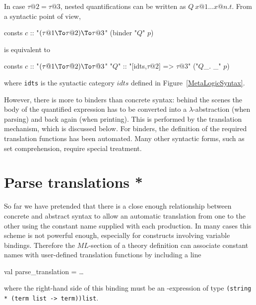 In case $\tau@2 = \tau@3$, nested quantifications can be written as $Q~x@1
\dots x@n.t$.  From a syntactic point of view,
\begin{ttbox}
consts \(c\) :: "\((\tau@1\To\tau@2)\To\tau@3\)"  (binder "\(Q\)" \(p\))
\end{ttbox}
is equivalent to
\begin{ttbox}
consts \(c\)   :: "\((\tau@1\To\tau@2)\To\tau@3\)"
       "\(Q\)" :: "[idts,\(\tau@2\)] => \(\tau@3\)"  ("\(Q\)_.  _" \(p\))
\end{ttbox}
where {\tt idts} is the syntactic category $idts$ defined in
Figure~\ref{MetaLogicSyntax}.

However, there is more to binders than concrete syntax: behind the scenes the
body of the quantified expression has to be converted into a
$\lambda$-abstraction (when parsing) and back again (when printing).  This
is performed by the translation mechanism, which is discussed below.  For
binders, the definition of the required translation functions has been
automated.  Many other syntactic forms, such as set comprehension, require
special treatment.


\section{Parse translations *}
\label{Parse-translations}

So far we have pretended that there is a close enough relationship between
concrete and abstract syntax to allow an automatic translation from one to
the other using the constant name supplied with each production.  In many
cases this scheme is not powerful enough, especially for constructs involving
variable bindings.  Therefore the $ML$-section of a theory definition can
associate constant names with user-defined translation functions by including
a line
\begin{ttbox}
val parse_translation = \dots
\end{ttbox}
where the right-hand side of this binding must be an \ML-expression of type
\verb$(string * (term list -> term))list$.


